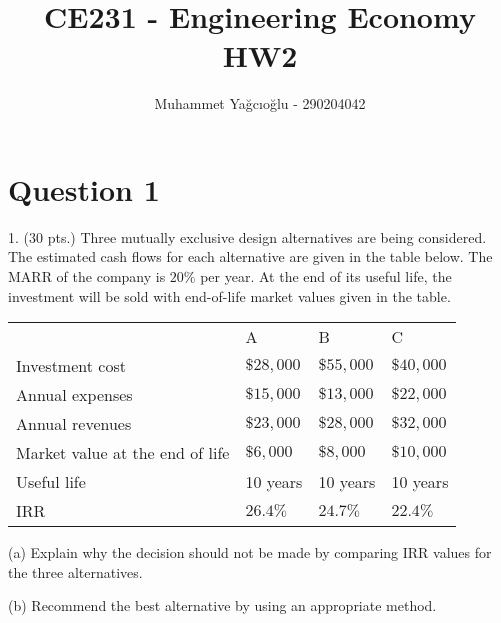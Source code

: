 \documentclass[12pt]{article}
\title{\vspace{-1cm}CE231 - Engineering Economy HW2}
\author{Muhammet Yağcıoğlu - 290204042}
\begin{document}
\pagestyle{fancy}
\maketitle\thispagestyle{fancy}

\tableofcontents

\newpage
\section*{Question 1}
\begin{q}
1. (30 pts.) Three mutually exclusive design alternatives are being considered. The estimated cash flows for each alternative are given in the table below. The MARR of the company is \(20 \%\) per year. At the end of its useful life, the investment will be sold with end-of-life market values given in the table.

\begin{center}
\begin{tabular}{llll} 
& A & B & C \\
\cline { 2 - 4 } Investment cost & \(\$ 28,000\) & \(\$ 55,000\) & \(\$ 40,000\) \\
Annual expenses & \(\$ 15,000\) & \(\$ 13,000\) & \(\$ 22,000\) \\
Annual revenues & \(\$ 23,000\) & \(\$ 28,000\) & \(\$ 32,000\) \\
Market value at the end of life & \(\$ 6,000\) & \(\$ 8,000\) & \(\$ 10,000\) \\
Useful life & 10 years & 10 years & 10 years \\
IRR & \(26.4 \%\) & \(24.7 \%\) & \(22.4 \%\)
\end{tabular}
\end{center}

(a) Explain why the decision should not be made by comparing IRR values for the three alternatives.

(b) Recommend the best alternative by using an appropriate method.
\end{q}
\end{document}
